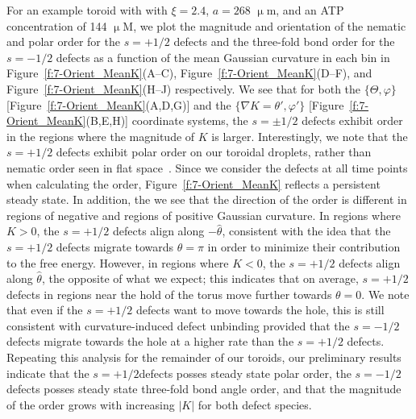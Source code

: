 For an example toroid with with $\xi = 2.4$, $a = 268$ $\upmu$m, and an ATP concentration of 144 $\upmu$M, we plot the magnitude and orientation of the nematic and polar order for the $s = +1/2$ defects and the three-fold bond order for the $s = -1/2$ defects as a function of the mean Gaussian curvature in each bin  in Figure~\ref{f:7-Orient_MeanK}(A--C), Figure~\ref{f:7-Orient_MeanK}(D--F), and Figure~\ref{f:7-Orient_MeanK}(H--J) respectively.
We see that for both the $\{\Theta,\varphi\}$ [Figure~\ref{f:7-Orient_MeanK}(A,D,G)] and the $\{ \nabla K = \theta',\varphi' \}$ [Figure~\ref{f:7-Orient_MeanK}(B,E,H)] coordinate systems, the $s = \pm 1/2$ defects exhibit order in the regions where the magnitude of $K$ is larger.
Interestingly, we note that the $s = +1/2$ defects exhibit polar order on our toroidal droplets, rather than nematic order seen in flat space~\cite{RN27}.
Since we consider the defects at all time points when calculating the order, Figure~\ref{f:7-Orient_MeanK} reflects a persistent steady state.
In addition, the we see that the direction of the order is different in regions of negative and regions of positive Gaussian curvature.
In regions where $K > 0$, the $s = +1/2$ defects align along $-\hat{\theta}$, consistent with the idea that the $s = +1/2$ defects migrate towards $\theta = \pi$ in order to minimize their contribution to the free energy.
However, in regions where $K < 0$, the $s = +1/2$ defects align along $\hat{\theta}$, the opposite of what we expect; this indicates that on average, $s = +1/2$ defects in regions near the hold of the torus move further towards $\theta = 0$.
We note that even if the $s = +1/2$ defects want to move towards the hole, this is still consistent with curvature-induced defect unbinding provided that the $s = -1/2$ defects migrate towards the hole at a higher rate than the $s = +1/2$ defects.
Repeating this analysis for the remainder of our toroids, our preliminary results indicate that the $s = +1/2$defects posses steady state polar order, the $s = -1/2$ defects posses steady state three-fold bond angle order, and that the magnitude of the order grows with increasing $|K|$ for both defect species.


